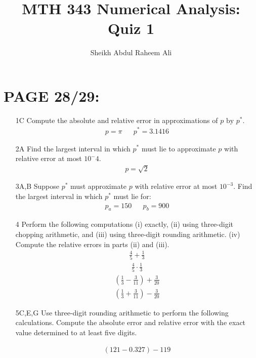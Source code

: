\documentclass[]{article}
\title{MTH 343 Numerical Analysis: Quiz 1}
\author{Sheikh Abdul Raheem Ali}
\begin{document}
\maketitle

\section*{PAGE 28/29:}		

\begin{enumerate}
	\item[1C] Compute the absolute and relative error in approximations of $ p \text{ by } p^* $.
	\begin{align*}
	p = \pi && p^* = 3.1416
	\end{align*}
	\item[2A] Find the largest interval in which $ p^* $ must lie to approximate $ p $ with relative error at most $ 10^-4 $.
	\begin{align*}
		p = \sqrt{2}
	\end{align*}
	\item[3A,B] Suppose $ p^* $ must approximate $ p $ with relative error at most $ 10^{-3} $. Find the largest interval in which $ p^* $ must lie for:
	\begin{align*}
	p_a = 150 && p_b = 900
	\end{align*}
	\item[4] Perform the following computations (i) exactly, (ii) using three-digit chopping arithmetic, and (iii) using three-digit rounding arithmetic. (iv) Compute the relative errors in parts (ii) and (iii).
	\begin{align*}
	\frac{4}{5} + \frac{1}{3}
	\end{align*}
	\begin{align*}
	\frac{4}{5} \cdot \frac{1}{3}
	\end{align*}
	\begin{align*}
	(\frac{1}{3} - \frac{3}{11}) + \frac{3}{20}
	\end{align*}
	\begin{align*}
	(\frac{1}{3} + \frac{3}{11}) - \frac{3}{20}
	\end{align*}

	\item[5C,E,G] Use three-digit rounding arithmetic to perform the following calculations. Compute the absolute error and relative error with the exact value determined to at least five digits.
	
	\begin{align*}
		(121 - 0.327) - 119
	\end{align*}


\end{enumerate}
\end{document}
